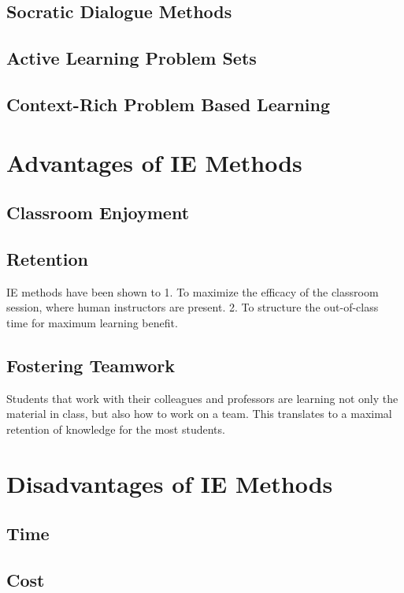 \subsection{Socratic Dialogue Methods}
\subsection{Active Learning Problem Sets}
\subsection{Context-Rich Problem Based Learning}

\section{Advantages of IE Methods}

\subsection{Classroom Enjoyment}

\subsection{Retention}

IE methods have been shown to
    1. To maximize the efficacy of the classroom session, where human instructors are present.
    2. To structure the out-of-class time for maximum learning benefit.

\subsection{Fostering Teamwork}

Students that work with their colleagues and professors are learning not only the material in class, but also how to work on a team. This translates to a maximal retention of knowledge for the most students\cite{novak1999}.

\section{Disadvantages of IE Methods}

\subsection{Time}
\subsection{Cost}
